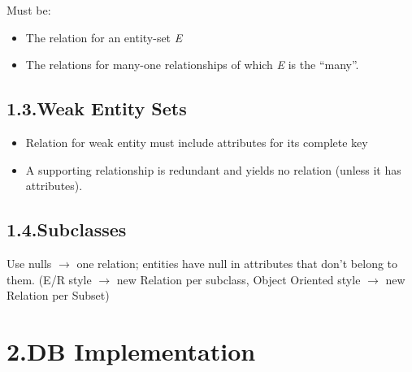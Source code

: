 \documentclass{article}
\begin{document}
\noindent{}Must be:%

\begin{itemize}[noitemsep,topsep=\mdcompacttopsep]%

\item{}The relation for an entity-set \emph{E}%

\item{}The relations for many-one relationships 
of which \emph{E} is the \textquotedblleft{}many\textquotedblright{}.%
\end{itemize}%

\subsection{1.3.\hspace*{0.5em}Weak Entity Sets}\label{sec-weak-entity-sets}%

\begin{itemize}[noitemsep,topsep=\mdcompacttopsep]%

\item{}Relation for weak entity must include
attributes for its complete key%

\item{}A supporting relationship is redundant
and yields no relation (unless it has
attributes).%
\end{itemize}%

\subsection{1.4.\hspace*{0.5em}Subclasses}\label{sec-subclasses}%

\noindent{}Use nulls \ensuremath{\rightarrow} one relation; entities have
null in attributes that don't belong to them.\mdbr
{}(E/R style \ensuremath{\rightarrow} new Relation per subclass, 
Object Oriented style \ensuremath{\rightarrow} new Relation per Subset)%

\section{2.\hspace*{0.5em}DB Implementation}\label{sec-db-implementation}%
\end{document}
